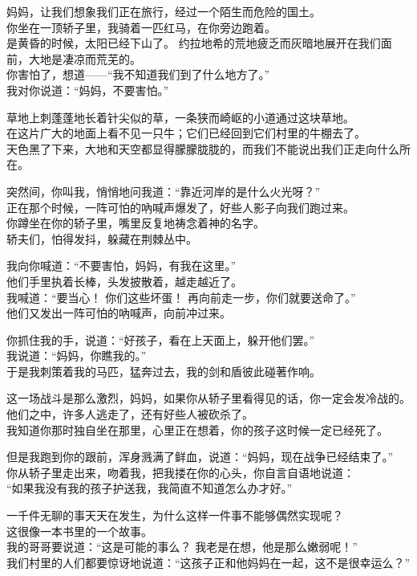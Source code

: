\documentclass[]{book}
\renewenvironment{quote}{\begin{VF}}{\end{VF}}
\begin{document}
\begin{quote}
妈妈，让我们想象我们正在旅行，经过一个陌生而危险的国土。\\
你坐在一顶轿子里，我骑着一匹红马，在你旁边跑着。\\
是黄昏的时候，太阳已经下山了。
约拉地希的荒地疲乏而灰暗地展开在我们面前，大地是凄凉而荒芜的。\\
你害怕了，想道------``我不知道我们到了什么地方了。''\\
我对你说道：``妈妈，不要害怕。''

草地上刺蓬蓬地长着针尖似的草，一条狭而崎岖的小道通过这块草地。\\
在这片广大的地面上看不见一只牛；它们已经回到它们村里的牛棚去了。\\
天色黑了下来，大地和天空都显得朦朦胧胧的，而我们不能说出我们正走向什么所在。

突然间，你叫我，悄悄地问我道：``靠近河岸的是什么火光呀？''\\
正在那个时候，一阵可怕的吶喊声爆发了，好些人影子向我们跑过来。\\
你蹲坐在你的轿子里，嘴里反复地祷念着神的名字。\\
轿夫们，怕得发抖，躲藏在荆棘丛中。

我向你喊道：``不要害怕，妈妈，有我在这里。''\\
他们手里执着长棒，头发披散着，越走越近了。\\
我喊道：``要当心！ 你们这些坏蛋！ 再向前走一步，你们就要送命了。''\\
他们又发出一阵可怕的吶喊声，向前冲过来。

你抓住我的手，说道：``好孩子，看在上天面上，躲开他们罢。''\\
我说道：``妈妈，你瞧我的。''\\
于是我刺策着我的马匹，猛奔过去，我的剑和盾彼此碰著作响。

这一场战斗是那么激烈，妈妈，如果你从轿子里看得见的话，你一定会发冷战的。\\
他们之中，许多人逃走了，还有好些人被砍杀了。\\
我知道你那时独自坐在那里，心里正在想着，你的孩子这时候一定已经死了。

但是我跑到你的跟前，浑身溅满了鲜血，说道：``妈妈，现在战争已经结束了。''\\
你从轿子里走出来，吻着我，把我搂在你的心头，你自言自语地说道：\\
``如果我没有我的孩子护送我，我简直不知道怎么办才好。''

一千件无聊的事天天在发生，为什么这样一件事不能够偶然实现呢？\\
这很像一本书里的一个故事。\\
我的哥哥要说道：``这是可能的事么？ 我老是在想，他是那么嫩弱呢！''\\
我们村里的人们都要惊讶地说道：``这孩子正和他妈妈在一起，这不是很幸运么？''
\end{quote}
\end{document}
